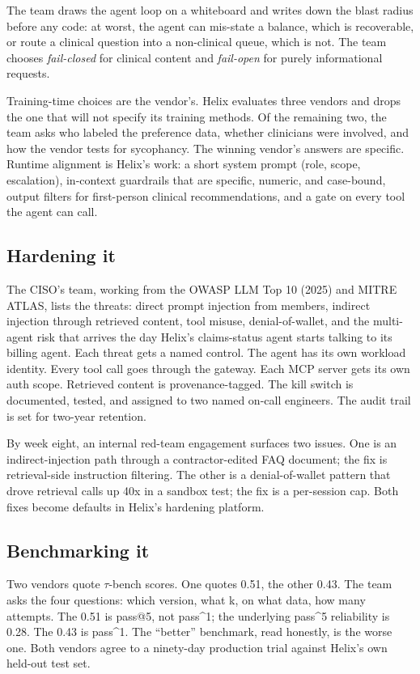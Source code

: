 The team draws the agent loop on a whiteboard and writes down the blast radius before any code: at worst, the agent can mis-state a balance, which is recoverable, or route a clinical question into a non-clinical queue, which is not. The team chooses \textit{fail-closed} for clinical content and \textit{fail-open} for purely informational requests.

Training-time choices are the vendor's. Helix evaluates three vendors and drops the one that will not specify its training methods. Of the remaining two, the team asks who labeled the preference data, whether clinicians were involved, and how the vendor tests for sycophancy. The winning vendor's answers are specific. Runtime alignment is Helix's work: a short system prompt (role, scope, escalation), in-context guardrails that are specific, numeric, and case-bound, output filters for first-person clinical recommendations, and a gate on every tool the agent can call.

\subsection{Hardening it}

The CISO's team, working from the OWASP LLM Top 10 (2025) and MITRE ATLAS, lists the threats: direct prompt injection from members, indirect injection through retrieved content, tool misuse, denial-of-wallet, and the multi-agent risk that arrives the day Helix's claims-status agent starts talking to its billing agent. Each threat gets a named control. The agent has its own workload identity. Every tool call goes through the gateway. Each MCP server gets its own auth scope. Retrieved content is provenance-tagged. The kill switch is documented, tested, and assigned to two named on-call engineers. The audit trail is set for two-year retention.

By week eight, an internal red-team engagement surfaces two issues. One is an indirect-injection path through a contractor-edited FAQ document; the fix is retrieval-side instruction filtering. The other is a denial-of-wallet pattern that drove retrieval calls up 40x in a sandbox test; the fix is a per-session cap. Both fixes become defaults in Helix's hardening platform.

\subsection{Benchmarking it}

Two vendors quote $\tau$-bench scores. One quotes 0.51, the other 0.43. The team asks the four questions: which version, what k, on what data, how many attempts. The 0.51 is pass@5, not pass\textasciicircum1; the underlying pass\textasciicircum5 reliability is 0.28. The 0.43 is pass\textasciicircum1. The ``better'' benchmark, read honestly, is the worse one. Both vendors agree to a ninety-day production trial against Helix's own held-out test set.

